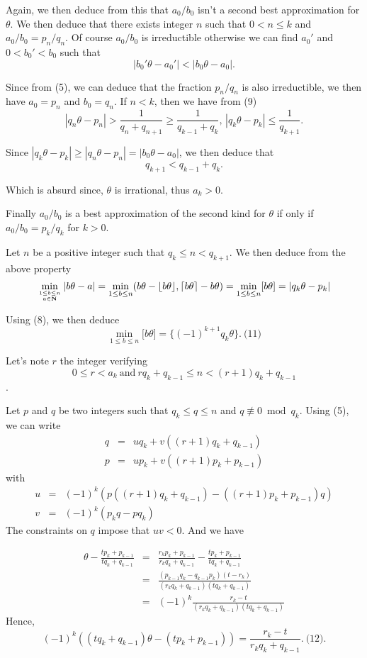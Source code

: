 \documentclass[a4paper,12pt]{article}
\begin{document}
Again, we then deduce from this that $a_0/b_0$ isn't a second best
approximation for $\theta$.  We then deduce that there exists integer
$n$ such that $0<n\le k$ and $a_0/b_0 = p_n/q_n$.  Of course $a_0/b_0$
is irreductible otherwise we can find $a_0'$ and $0 < b_0'< b_0$ such
that
\[ |b_0'\theta - a_0'| < |b_0 \theta - a_0|.\]

Since from (5), we can deduce that the fraction $p_n/q_n$ is also
irreductible, we then have $a_0 = p_n$ and $b_0 = q_n$.  If $n < k$,
then we have from (9)
\[ |q_n\theta - p_n| > \frac{1}{q_n+q_{n+1}} \ge
\frac{1}{q_{k-1}+q_k},\,|q_k \theta - p_k| \le \frac{1}{q_{k+1}}. \]

Since $|q_k\theta - p_k| \ge |q_n\theta - p_n| = |b_0\theta - a_0|$,
we then deduce that
\[ q_{k+1} < q_{k-1} + q_k.\]

Which is absurd since, $\theta$ is irrational, thus $a_k > 0$.

Finally $a_0/b_0$ is a best approximation of the second kind for
$\theta$ if only if $a_0/b_0 = p_k/q_k$ for $k>0$.

Let $n$ be a positive integer such that $q_k\le n < q_{k+1}$.  We then
deduce from the above property
\begin{eqnarray*}
  \min_{1\le b\le n\atop a\in\mathbf{N}}|b\theta - a| = \min_{1\le
    b\le n}(b\theta - \lfloor b\theta\rfloor, \lceil b\theta\rceil -
  b\theta) = \min_{1\le b\le n}\lbrack b\theta\rbrack = |q_k\theta - p_k|
\end{eqnarray*}

Using (8), we then deduce
\[ \min_{1\le b\le n}\lbrack b\theta\rbrack =
\{(-1)^{k+1}q_k\theta\}.\ \mbox{(11)}\]

Let's note $r$ the integer verifying
\[0\le r< a_k\ \mbox{and}\ rq_k + q_{k-1} \le n < (r+1)q_k +
q_{k-1}\].

Let $p$ and $q$ be two integers such that $q_k \le q \le n$ and $q
\not\equiv 0 \bmod{q_k}$.  Using (5), we can write
\begin{eqnarray*}
  q &=& u q_k + v ((r+1)q_k + q_{k-1}) \\
  p &=& u p_k + v ((r+1)p_k + p_{k-1})
\end{eqnarray*}
with
\begin{eqnarray*}
  u &=& (-1)^k ( p ((r+1)q_k + q_{k-1}) - ((r+1) p_k + p_{k-1}) q) \\
  v &=& (-1)^k ( p_k q - p q_k)
\end{eqnarray*}
The constraints on $q$ impose that $uv < 0$.  And we have

\begin{eqnarray*}
  \theta - \frac{t p_k + p_{k-1}}{tq_k + q_{k-1}} &=&
  \frac{r_k p_k + p_{k-1}}{r_k q_k + q_{k-1}} - \frac{tp_k +
    p_{k-1}}{tq_k + q_{k-1}} \\
  &=&\frac{(p_{k-1}q_k - q_{k-1}p_k)(t - r_k)}{(r_k q_k +
    q_{k-1})(tq_k+q_{k-1})} \\
  &=& (-1)^k \frac{r_k - t}{(r_k q_k + q_{k-1})(t q_k + q_{k-1})}
\end{eqnarray*}
Hence,
\[ (-1)^k((tq_k + q_{k-1})\theta - (tp_k + p_{k-1})) = \frac{r_k -
  t}{r_kq_k + q_{k-1}}.\ \mbox{(12)}.\]
\end{document}

